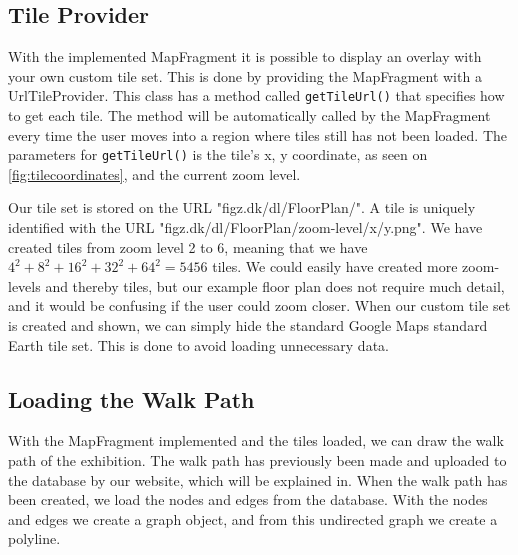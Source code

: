 \subsection*{Tile Provider}
With the implemented MapFragment it is possible to display an overlay with your own custom tile set. This is done by providing the MapFragment with a UrlTileProvider\citep{tilecoordinates}. This class has a method called \lstinline|getTileUrl()| that specifies how to get each tile. The method will be automatically called by the MapFragment every time the user moves into a region where tiles still has not been loaded. The parameters for \lstinline|getTileUrl()| is the tile's x, y coordinate, as seen on \autoref{fig:tilecoordinates}, and the current zoom level.

Our tile set is stored on the URL "figz.dk/dl/FloorPlan/". A tile is uniquely identified with the URL "figz.dk/dl/FloorPlan/zoom-level/x/y.png". We have created tiles from zoom level 2 to 6, meaning that we have $4^2+8^2+16^2+32^2+64^2 = 5456$ tiles. We could easily have created more zoom-levels and thereby tiles, but our example floor plan does not require much detail, and it would be confusing if the user could zoom closer. When our custom tile set is created and shown, we can simply hide the standard Google Maps standard Earth tile set. This is done to avoid loading unnecessary data.

\subsection*{Loading the Walk Path}
With the MapFragment implemented and the tiles loaded, we can draw the walk path of the exhibition. The walk path has previously been made and uploaded to the database by our website, which will be explained in. When the walk path has been created, we load the nodes and edges from the database. With the nodes and edges we create a graph object, and from this undirected graph we create a polyline.

